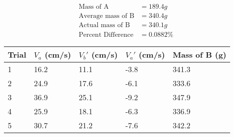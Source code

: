 \begin{equation*}
    \begin{aligned}
        \text{Mass of A}&=189.4g \\
        \text{Average mass of B}&=340.4g \\
        \text{Actual mass of B}&=340.1g \\
        \text{Percent Difference}&=0.0882\%
    \end{aligned}    
\end{equation*}
\begin{table}[H]
    \begin{tabular}{|l|l|l|l|l|}
    \hline
    Trial & $V_a$ (cm/s) & $V_b'$ (cm/s) & $V_a'$ (cm/s) & Mass of B (g) \\ \hline
    1     & 16.2        & 11.1        & -3.8         & 341.3         \\ \hline
    2     & 24.9        & 17.6        & -6.1         & 333.6         \\ \hline
    3     & 36.9        & 25.1        & -9.2         & 347.9         \\ \hline
    4     & 25.9        & 18.1        & -6.3         & 336.9         \\ \hline
    5     & 30.7        & 21.2        & -7.6         & 342.2         \\ \hline
    \end{tabular}
    \end{table}